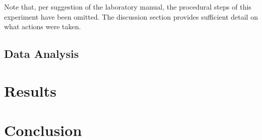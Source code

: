 \documentclass[a4paper]{article}
\begin{document}


Note that, per suggestion of the laboratory manual, the procedural steps of this experiment have been omitted. The discussion section provides sufficient detail on what actions were taken.

\subsection{Data Analysis}









\section{Results}



\section{Conclusion}
\end{document}
